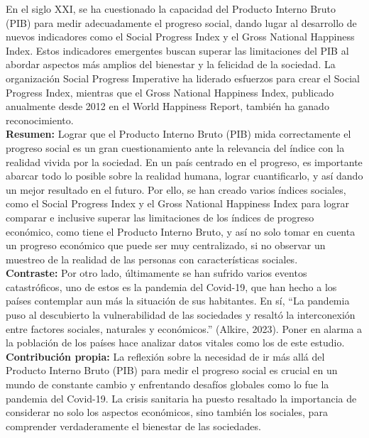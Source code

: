En el siglo XXI, se ha cuestionado la capacidad del Producto Interno Bruto (PIB) para medir adecuadamente el progreso social, dando lugar al desarrollo de nuevos indicadores como el Social Progress Index y el Gross National Happiness Index. Estos indicadores emergentes buscan superar las limitaciones del PIB al abordar aspectos más amplios del bienestar y la felicidad de la sociedad. La organización Social Progress Imperative ha liderado esfuerzos para crear el Social Progress Index, mientras que el Gross National Happiness Index, publicado anualmente desde 2012 en el World Happiness Report, también ha ganado reconocimiento.\\

\textbf{Resumen:} Lograr que el Producto Interno Bruto (PIB) mida correctamente el progreso social es un gran cuestionamiento ante la relevancia del índice con la realidad vivida por la sociedad. En un país centrado en el progreso, es importante abarcar todo lo posible sobre la realidad humana,  lograr cuantificarlo, y así dando un mejor resultado en el futuro. Por ello, se han creado varios índices sociales, como el Social Progress Index y el Gross National Happiness Index para lograr comparar e inclusive superar las limitaciones de los índices de progreso económico, como tiene el Producto Interno Bruto, y así no solo tomar en cuenta un progreso económico que puede ser muy centralizado, si no observar un muestreo de la realidad de las personas con características sociales. \\

\textbf{Contraste:} Por otro lado, últimamente se han sufrido varios eventos catastróficos, uno de estos es la pandemia del Covid-19, que han hecho a los países contemplar aun más la situación de sus habitantes. En sí, ``La pandemia puso al descubierto la vulnerabilidad de las sociedades y resaltó la interconexión entre factores sociales, naturales y económicos.'' (Alkire, 2023). Poner en alarma a la población de los países hace analizar datos vitales como los de este estudio.\\

\textbf{Contribución propia:} La reflexión sobre la necesidad de ir más allá del Producto Interno Bruto (PIB) para medir el progreso social es crucial en un mundo de constante cambio y enfrentando desafíos globales como lo fue la pandemia del Covid-19. La crisis sanitaria ha puesto resaltado la importancia de considerar no solo los aspectos económicos, sino también los sociales, para comprender verdaderamente el bienestar de las sociedades. \\

